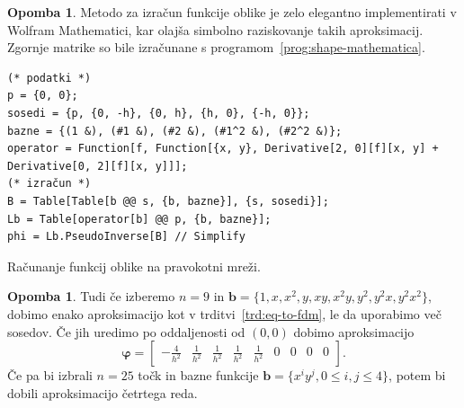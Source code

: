 \documentclass[12pt,a4paper,twoside]{article}
\theoremstyle{definition} %
\newtheorem{opomba}[definicija]{Opomba}
\theoremstyle{plain} %
\numberwithin{equation}{section}
\renewcommand{\b}{\boldsymbol}
\renewcommand{\phi}{\varphi}
\begin{document}
\begin{opomba}
  Metodo za izračun funkcije oblike je zelo elegantno implementirati v
  Wolfram Mathematici, kar olajša simbolno raziskovanje takih aproksimacij.
  Zgornje matrike so bile izračunane s programom~\ref{prog:shape-mathematica}.

  \begin{listing}[!h]
    \vspace{-1ex}
  \begin{verbatim}
(* podatki *)
p = {0, 0};
sosedi = {p, {0, -h}, {0, h}, {h, 0}, {-h, 0}};
bazne = {(1 &), (#1 &), (#2 &), (#1^2 &), (#2^2 &)};
operator = Function[f, Function[{x, y}, Derivative[2, 0][f][x, y] + Derivative[0, 2][f][x, y]]];
(* izračun *)
B = Table[Table[b @@ s, {b, bazne}], {s, sosedi}];
Lb = Table[operator[b] @@ p, {b, bazne}];
phi = Lb.PseudoInverse[B] // Simplify
  \end{verbatim}
  \vspace{-3ex}
  \caption{Računanje funkcij oblike na pravokotni mreži.}
  \label{prog:shape-mathematica}
  \end{listing}
\end{opomba}
\begin{opomba}
  \label{op:fdm-9}
  Tudi če izberemo $n=9$ in $\b b = \{1, x, x^2, y, xy, x^2y, y^2, y^2x, y^2
  x^2 \}$, dobimo enako aproksimacijo kot v trditvi~\ref{trd:eq-to-fdm}, le da
  uporabimo več sosedov. Če jih uredimo po oddaljenosti od $(0, 0)$ dobimo
  aproksimacijo
  \begin{equation}
    \b\phi =  \begin{bmatrix}
    -\frac{4}{h^2} & \frac{1}{h^2} & \frac{1}{h^2} & \frac{1}{h^2} &
    \frac{1}{h^2} & 0 & 0 & 0 & 0
  \end{bmatrix}.
    \label{eq:shape-mon9}
  \end{equation}
 Če pa bi izbrali $n=25$ točk in bazne funkcije $\b b = \{x^iy^j, 0 \leq i, j
 \leq 4 \}$, potem bi dobili aproksimacijo četrtega reda.
\end{opomba}
\end{document}
